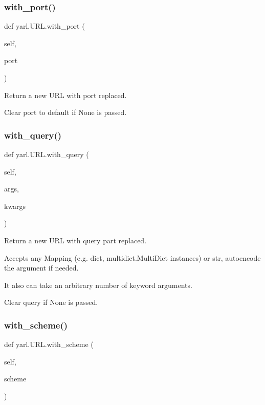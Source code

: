 \subsubsection{\texorpdfstring{with\+\_\+port()}{with\_port()}}
{\footnotesize\ttfamily def yarl.\+U\+R\+L.\+with\+\_\+port (\begin{DoxyParamCaption}\item[{}]{self,  }\item[{}]{port }\end{DoxyParamCaption})}

\begin{DoxyVerb}Return a new URL with port replaced.

Clear port to default if None is passed.\end{DoxyVerb}
 \mbox{\label{classyarl_1_1_u_r_l_af83468597cc7a9ba6bfc9ec3da6fe262}} 
\subsubsection{\texorpdfstring{with\+\_\+query()}{with\_query()}}
{\footnotesize\ttfamily def yarl.\+U\+R\+L.\+with\+\_\+query (\begin{DoxyParamCaption}\item[{}]{self,  }\item[{}]{args,  }\item[{}]{kwargs }\end{DoxyParamCaption})}

\begin{DoxyVerb}Return a new URL with query part replaced.

Accepts any Mapping (e.g. dict, multidict.MultiDict instances)
or str, autoencode the argument if needed.

It also can take an arbitrary number of keyword arguments.

Clear query if None is passed.\end{DoxyVerb}
 \mbox{\label{classyarl_1_1_u_r_l_a2af372c47bdd3df6ef0a01d6d996e4d4}} 
\subsubsection{\texorpdfstring{with\+\_\+scheme()}{with\_scheme()}}
{\footnotesize\ttfamily def yarl.\+U\+R\+L.\+with\+\_\+scheme (\begin{DoxyParamCaption}\item[{}]{self,  }\item[{}]{scheme }\end{DoxyParamCaption})}

